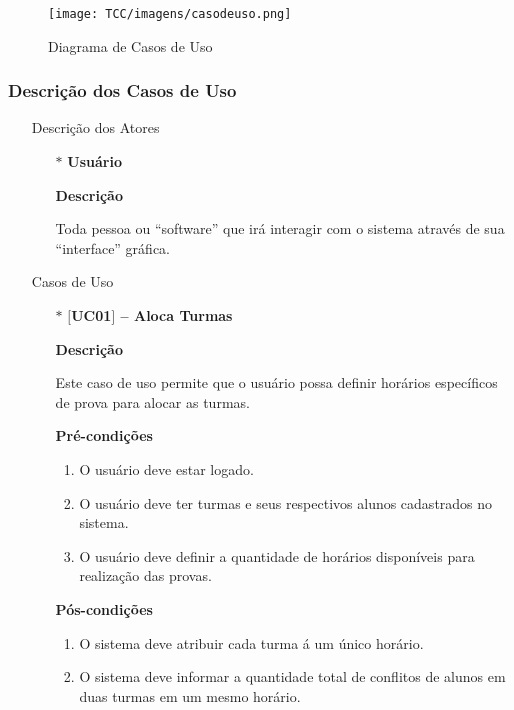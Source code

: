 \begin{figure}[h!]
     \centering
     \texttt{[image: TCC/imagens/casodeuso.png]}
     \caption{Diagrama de Casos de Uso}
     \label{Diagrama de Casos de Uso}
\end{figure}

 
\subsubsection{Descrição dos Casos de Uso}


\begin{itemize}
    \item[] Descrição dos Atores
    
    \begin{itemize}
        \item[$\ast$] \textbf{Usuário}
        
        \textbf{Descrição} 
        
        Toda pessoa ou “software” que irá interagir com o sistema através de sua “interface” gráfica.
    \end{itemize}
    
    \item[] Casos de Uso
    
    \begin{itemize}
        \item[$\ast$] \textbf{$[$UC01$]$ -- Aloca Turmas}
        
        \textbf{Descrição}
        
         Este caso de uso permite que o usuário possa definir horários específicos de prova para alocar as turmas.
        
        \textbf{Pré-condições}
        \begin{enumerate}
            \item O usuário deve estar logado.
            \item O usuário deve ter turmas e seus respectivos alunos cadastrados no sistema.
            \item O usuário deve definir a quantidade de horários disponíveis para realização das provas.
        \end{enumerate}
       
        \textbf{Pós-condições}
        \begin{enumerate}
            \item  O sistema deve atribuir cada turma á um único horário.
            \item  O sistema deve informar a quantidade total de conflitos de alunos em duas turmas em um mesmo horário.
        \end{enumerate}
       

\end{itemize}
\end{itemize}
